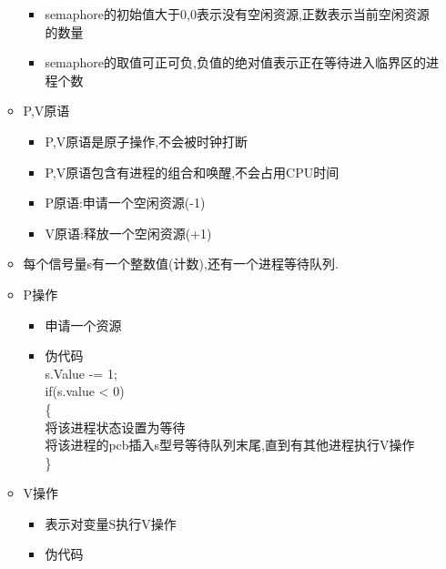 \documentclass[a4paper,12pt,notitlepage]{article}
\begin{document}
\begin{itemize}
\begin{itemize}
\begin{itemize}
			\item semaphore的初始值大于0,0表示没有空闲资源,正数表示当前空闲资源的数量
			\item semaphore的取值可正可负,负值的绝对值表示正在等待进入临界区的进程个数
		\end{itemize}
		\item P,V原语
		\begin{itemize}
			\item P,V原语是原子操作,不会被时钟打断
			\item P,V原语包含有进程的组合和唤醒,不会占用CPU时间
			\item P原语:申请一个空闲资源(-1)
			\item V原语:释放一个空闲资源(+1)
		\end{itemize}
		\item 每个信号量s有一个整数值(计数),还有一个进程等待队列.
		\item P操作
		\begin{itemize}
			\item 申请一个资源
			\item  伪代码\\
			
	s.Value -= 1; \\
	if(s.value < 0) \\
	\{ \\
		将该进程状态设置为等待 \\
		将该进程的pcb插入s型号等待队列末尾,直到有其他进程执行V操作 \\
	\} \\
	
		\end{itemize}
		\item V操作
		\begin{itemize}
			\item 表示对变量S执行V操作
			\item 伪代码 \\
			

\end{itemize}
\end{itemize}
\end{itemize}
\end{document}
